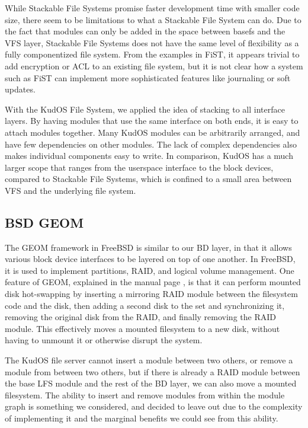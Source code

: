 While Stackable File Systems promise faster development time with smaller code
size, there seem to be limitations to what a Stackable File System can do.
Due to the fact that modules can only be added in the space between basefs and
the VFS layer, Stackable File Systems does not have the same level of
flexibility as a fully componentized file system. From the examples in FiST, it
appears trivial to add encryption or ACL to an existing file system, but it is
not clear how a system such as FiST can implement more sophisticated features
like journaling or soft updates.

With the KudOS File System, we applied the idea of stacking to all interface
layers. By having modules that use the same interface on both ends, it is easy
to attach modules together. Many KudOS modules can be arbitrarily arranged, and
have few dependencies on other modules. The lack of complex dependencies also
makes individual components easy to write. In comparison, KudOS has a much larger
scope that ranges from the userspace interface to the block devices, compared to
Stackable File Systems, which is confined to a small area between VFS and the
underlying file system.

\subsection{BSD GEOM}
\label{sec:related:geom}

The GEOM framework in FreeBSD is similar to our BD layer, in that it allows
various block device interfaces to be layered on top of one another. In FreeBSD,
it is used to implement partitions, RAID, and logical volume management. One
feature of GEOM, explained in the manual page \cite{geom}, is that it can
perform mounted disk hot-swapping by inserting a mirroring RAID module between
the filesystem code and the disk, then adding a second disk to the set and
synchronizing it, removing the original disk from the RAID, and finally removing
the RAID module. This effectively moves a mounted filesystem to a new disk,
without having to unmount it or otherwise disrupt the system.

The KudOS file server cannot insert a module between two others, or remove a
module from between two others, but if there is already a RAID module between
the base LFS module and the rest of the BD layer, we can also move a mounted
filesystem. The ability to insert and remove modules from within the module
graph is something we considered, and decided to leave out due to the complexity
of implementing it and the marginal benefits we could see from this ability.


